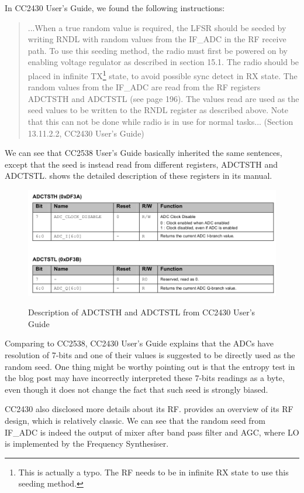 In CC2430 User's Guide, we found the following instructions:
\begin{quote}
...When a true random value is required, the LFSR should be seeded by writing RNDL with random values from the IF\_ADC in the RF receive path. To use this seeding method, the radio must first be powered on by enabling voltage regulator as described in section 15.1. The radio should be placed in infinite TX\footnote{This is actually a typo. The RF needs to be in infinite RX state to use this seeding method.} state, to avoid possible sync detect in RX state. The random values from the IF\_ADC are read from the RF registers ADCTSTH and ADCTSTL (see page 196). The values read are used as the seed values to be written to the RNDL register as described above. Note that this can not be done while radio is in use for normal tasks... (Section 13.11.2.2, CC2430 User's Guide)
\end{quote}

We can see that CC2538 User's Guide basically inherited the same sentences, except that the seed is instead read from different registers, ADCTSTH and ADCTSTL.  shows the detailed description of these registers in its manual.

\begin{figure}[ht!]
\center
\caption{Description of ADCTSTH and ADCTSTL from CC2430 User's Guide}
\includegraphics[width=\linewidth]{./figures/CC2430_ADCTST.png}
\label{CC2430_ADCTST}
\end{figure}

Comparing to CC2538, CC2430 User's Guide explains that the ADCs have resolution of 7-bits and one of their values is suggested to be directly used as the random seed. One thing might be worthy pointing out is that the entropy test in the blog post\cite{CC2430Fail} may have incorrectly interpreted these 7-bits readings as a byte, even though it does not change the fact that such seed is strongly biased.

CC2430 also disclosed more details about its RF.  provides an overview of its RF design, which is relatively classic. We can see that the random seed from IF\_ADC is indeed the output of mixer after band pass filter and AGC, where LO is implemented by the Frequency Synthesiser.

